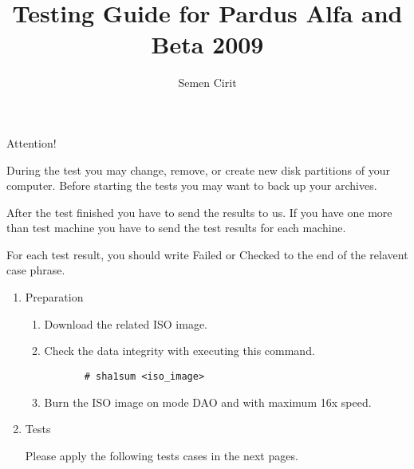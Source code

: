 \documentclass[a4paper,10pt]{article}
\title{Testing Guide for Pardus Alfa and Beta 2009}
\author{Semen Cirit}
\begin{document}
\maketitle

Attention!

    During the test you may change, remove, or create new disk partitions of your computer. 
    Before starting the tests you may want to back up your archives.

    After the test finished you have to send the results to us. If you have one more than test machine you have to send the test results for each machine.

    For each test result, you should write Failed or Checked to the end of the relavent case phrase.

\begin{enumerate}
\item Preparation
  \begin{enumerate}
    \item Download the related ISO image.
    \item Check the data integrity with executing this command.
      \begin{verbatim}
       # sha1sum <iso_image>
      \end{verbatim}
    \item Burn the ISO image on mode DAO and with maximum 16x speed.
  \end{enumerate}
  \item Tests
    
    Please apply the following tests cases in the next pages.
 \end{enumerate}
\end{document}
